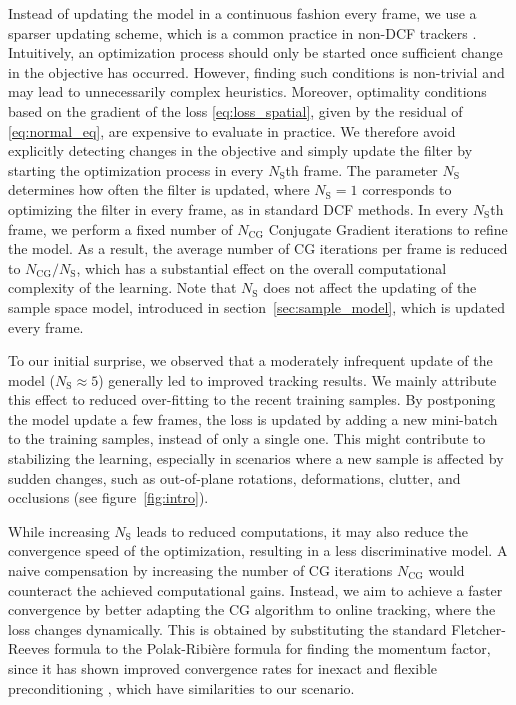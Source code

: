 \documentclass[10pt,twocolumn,letterpaper]{article}
\begin{document}
Instead of updating the model in a continuous fashion every frame, we use a sparser updating scheme, which is a common practice in non-DCF trackers \cite{MDNet,MEEM2014}. Intuitively, an optimization process should only be started once sufficient change in the objective has occurred. However, finding such conditions is non-trivial and may lead to unnecessarily complex heuristics. Moreover, optimality conditions based on the gradient of the loss \eqref{eq:loss_spatial}, given by the residual of \eqref{eq:normal_eq}, are expensive to evaluate in practice. We therefore avoid explicitly detecting changes in the objective and simply update the filter by starting the optimization process in every $N_\text{S}$th frame. The parameter $N_\text{S}$ determines how often the filter is updated, where $N_\text{S} = 1$ corresponds to optimizing the filter in every frame, as in standard DCF methods. In every $N_\text{S}$th frame, we perform a fixed number of $N_\text{CG}$ Conjugate Gradient iterations to refine the model. As a result, the average number of CG iterations per frame is reduced to $N_\text{CG} / N_\text{S}$, which has a substantial effect on the overall computational complexity of the learning. Note that $N_\text{S}$ does not affect the updating of the sample space model, introduced in section~\ref{sec:sample_model}, which is updated every frame. 

To our initial surprise, we observed that a moderately infrequent update of the model ($N_\text{S} \approx 5$) generally led to improved tracking results. We mainly attribute this effect to reduced over-fitting to the recent training samples. By postponing the model update a few frames, the loss is updated by adding a new mini-batch to the training samples, instead of only a single one. This might contribute to stabilizing the learning, especially in scenarios where a new sample is affected by sudden changes, such as out-of-plane rotations, deformations, clutter, and occlusions (see figure~\ref{fig:intro}).

While increasing $N_\text{S}$ leads to reduced computations, it may also reduce the convergence speed of the optimization, resulting in a less discriminative model. A naive compensation by increasing the number of CG iterations $N_\text{CG}$ would counteract the achieved computational gains. Instead, we aim to achieve a faster convergence by better adapting the CG algorithm to online tracking, where the loss changes dynamically. This is obtained by substituting the standard Fletcher-Reeves formula to the Polak-Ribi\`ere formula \cite{CGpain} for finding the momentum factor, since it has shown improved convergence rates for inexact and flexible preconditioning \cite{IPCG}, which have similarities to our scenario.
 
\end{document}
